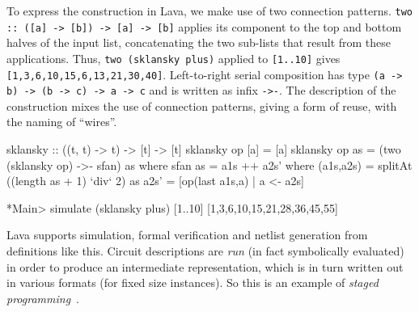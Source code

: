 To express the construction in Lava, we make use of two connection patterns.
{\tt two :: ([a] -> [b]) -> [a] -> [b]} applies its component to
the top and bottom halves of the input list, concatenating the two sub-lists
that result from these applications.
Thus, {\tt two (sklansky plus)} applied to {\tt [1..10]} gives {\tt [1,3,6,10,15,6,13,21,30,40]}.
Left-to-right serial composition has type
{\tt (a -> b) -> (b -> c) -> a -> c} and is written as infix {\tt ->-}.
The description of the construction mixes the use of connection patterns, giving a form of reuse, with the naming of ``wires''.

\begin{code}
sklansky :: ((t, t) -> t) -> [t] -> [t]
sklansky op [a] = [a]
sklansky op as = (two (sklansky op) ->- sfan) as
  where
    sfan as = a1s ++ a2s'
      where
        (a1s,a2s) = splitAt ((length as + 1) `div` 2) as
        a2s'      = [op(last a1s,a) | a <- a2s]

*Main> simulate (sklansky plus) [1..10]
[1,3,6,10,15,21,28,36,45,55]
\end{code}

Lava supports simulation, formal verification and netlist generation from definitions like this. Circuit descriptions are {\em run} (in fact symbolically evaluated) in order to produce an intermediate representation, which is in turn written out in various formats (for fixed size instances). So this is an example of {\em staged programming}~\cite{Taha03}.

